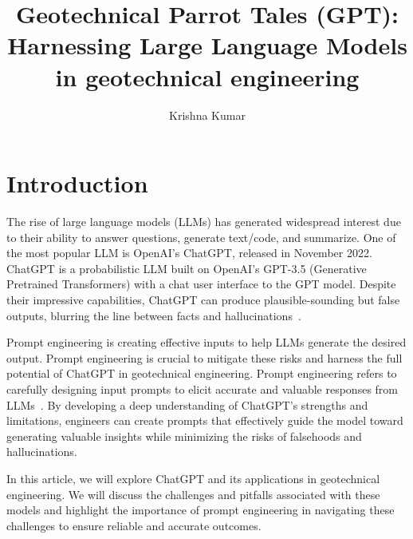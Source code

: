 \documentclass[12pt]{article}
\title{Geotechnical Parrot Tales (GPT): Harnessing Large Language Models in geotechnical engineering}
\author{Krishna Kumar}
\date{}
\begin{document}
\maketitle

\doublespacing
\linenumbers

\section{Introduction}
The rise of large language models (LLMs) has generated widespread interest due to their ability to answer questions, generate text/code, and summarize. One of the most popular LLM is OpenAI's ChatGPT, released in November 2022. ChatGPT is a probabilistic LLM built on OpenAI's GPT-3.5 (Generative Pretrained Transformers) with a chat user interface to the GPT model. Despite their impressive capabilities, ChatGPT can produce plausible-sounding but false outputs, blurring the line between facts and hallucinations~\parencite{bender2021dangers}.

Prompt engineering is creating effective inputs to help LLMs generate the desired output. Prompt engineering is crucial to mitigate these risks and harness the full potential of ChatGPT in geotechnical engineering. Prompt engineering refers to carefully designing input prompts to elicit accurate and valuable responses from LLMs~\parencite{petroni2020context}. By developing a deep understanding of ChatGPT's strengths and limitations, engineers can create prompts that effectively guide the model toward generating valuable insights while minimizing the risks of falsehoods and hallucinations.

In this article, we will explore ChatGPT and its applications in geotechnical engineering. We will discuss the challenges and pitfalls associated with these models and highlight the importance of prompt engineering in navigating these challenges to ensure reliable and accurate outcomes.
\end{document}
